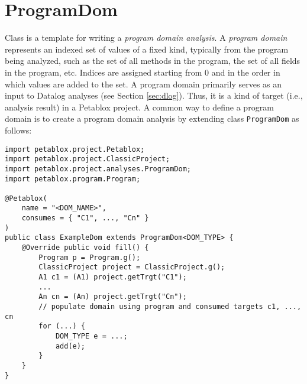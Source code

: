 
\section{ProgramDom}
\label{sec:program-dom}

Class 
is a template for writing a {\it program domain analysis}.
A {\it program domain} represents an indexed set of values of a fixed
kind, typically from the program being analyzed, such as the set of all methods
in the program, the set of all fields in the program, etc.  Indices are 
assigned starting from 0 and in the order in which values are added to the set.
A program domain primarily serves as an input to Datalog analyses
(see Section \ref{sec:dlog}).  Thus, it is a kind of target (i.e.,
analysis result) in a Petablox project.  A common way to define a program domain
is to create a program domain analysis by extending class {\tt ProgramDom} as
follows:

\begin{framed}
\begin{verbatim}
import petablox.project.Petablox;
import petablox.project.ClassicProject;
import petablox.project.analyses.ProgramDom;
import petablox.program.Program;

@Petablox(
    name = "<DOM_NAME>",
    consumes = { "C1", ..., "Cn" }
)
public class ExampleDom extends ProgramDom<DOM_TYPE> {
    @Override public void fill() {
        Program p = Program.g();
        ClassicProject project = ClassicProject.g();
        A1 c1 = (A1) project.getTrgt("C1");
        ...
        An cn = (An) project.getTrgt("Cn");
        // populate domain using program and consumed targets c1, ..., cn
        for (...) {
            DOM_TYPE e = ...;
            add(e); 
        }
    }
}
\end{verbatim}
\end{framed}

